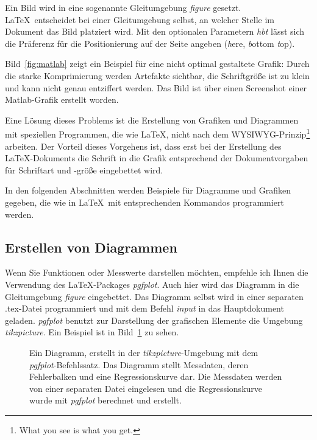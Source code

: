 Ein Bild wird in eine sogenannte Gleitumgebung \textit{figure} gesetzt. \LaTeX~entscheidet bei einer Gleitumgebung selbst, an welcher Stelle im Dokument das Bild platziert wird. Mit den optionalen Parametern \textit{hbt} lässt sich die Präferenz für die Positionierung auf der Seite angeben (\textit{h}ere, \textit{b}ottom \textit{t}op).

Bild~\ref{fig:matlab} zeigt ein Beispiel für eine nicht optimal gestaltete Grafik: Durch die starke Komprimierung werden Artefakte sichtbar, die Schriftgröße ist zu klein und kann nicht genau entziffert werden. Das Bild ist über einen Screenshot einer Matlab-Grafik erstellt worden.


Eine Lösung dieses Problems ist die Erstellung von Grafiken und Diagrammen mit speziellen Programmen, die wie \LaTeX, nicht nach dem WYSIWYG-Prinzip\footnote{What you see is what you get.} arbeiten. Der Vorteil dieses Vorgehens ist, dass erst bei der Erstellung des \LaTeX-Dokuments die Schrift in die Grafik entsprechend der Dokumentvorgaben für Schriftart und -größe eingebettet wird.

In den folgenden Abschnitten werden Beispiele für Diagramme und Grafiken gegeben, die wie in \LaTeX~mit entsprechenden Kommandos programmiert werden.

\subsection{Erstellen von Diagrammen}

Wenn Sie Funktionen oder Messwerte darstellen möchten, empfehle ich Ihnen die Verwendung des \LaTeX-Packages \textit{pgfplot}. Auch hier wird das Diagramm in die Gleitumgebung \textit{figure} eingebettet. Das Diagramm selbst wird in einer separaten .tex-Datei programmiert und mit dem Befehl \textit{input} in das Hauptdokument geladen. \textit{pgfplot} benutzt zur Darstellung der grafischen Elemente die Umgebung \textit{tikzpicture}. Ein Beispiel ist in Bild~\ref{fig:pgfplot} zu sehen.

\begin{figure}[hbt]
	\centering
	
	\caption[Diagramm, mit dem \textit{pgfplot}-Befehlssatz]{Ein Diagramm, erstellt in der \textit{tikzpicture}-Umgebung mit dem \textit{pgfplot}-Befehlssatz. Das Diagramm stellt Messdaten, deren Fehlerbalken und eine Regressionskurve dar. Die Messdaten werden von einer separaten Datei eingelesen und die Regressionskurve wurde mit \textit{pgfplot} berechnet und erstellt.}
	\label{fig:pgfplot}
\end{figure}

